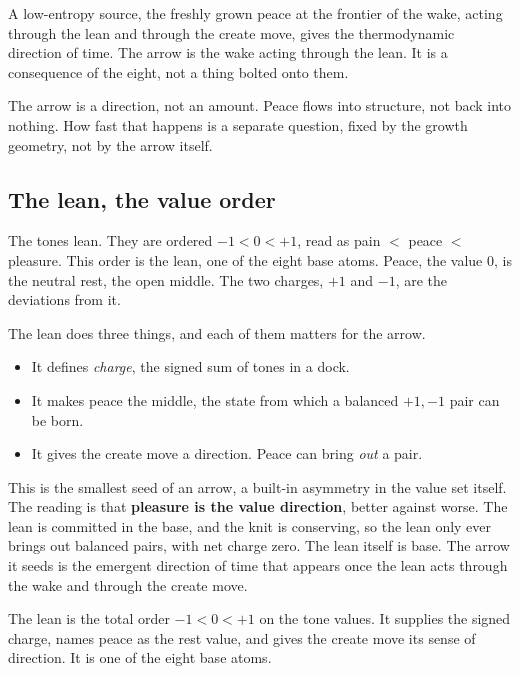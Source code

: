 A low-entropy source, the freshly grown peace at the frontier of the wake, acting through the lean and through the create move, gives the thermodynamic direction of time. The arrow is the wake acting through the lean. It is a consequence of the eight, not a thing bolted onto them.

\begin{result}
The arrow is a direction, not an amount. Peace flows into structure, not back into nothing. How fast that happens is a separate question, fixed by the growth geometry, not by the arrow itself.
\end{result}

\subsection{The lean, the value order}

The tones lean. They are ordered $-1 < 0 < +1$, read as pain $<$ peace $<$ pleasure. This order is the lean, one of the eight base atoms. Peace, the value $0$, is the neutral rest, the open middle. The two charges, $+1$ and $-1$, are the deviations from it.

The lean does three things, and each of them matters for the arrow.

\begin{itemize}
\item It defines \emph{charge}, the signed sum of tones in a dock.
\item It makes peace the middle, the state from which a balanced $+1, -1$ pair can be born.
\item It gives the create move a direction. Peace can bring \emph{out} a pair.
\end{itemize}

This is the smallest seed of an arrow, a built-in asymmetry in the value set itself. The reading is that \textbf{pleasure is the value direction}, better against worse. The lean is committed in the base, and the knit is conserving, so the lean only ever brings out balanced pairs, with net charge zero. The lean itself is base. The arrow it seeds is the emergent direction of time that appears once the lean acts through the wake and through the create move.

\begin{definition}
The lean is the total order $-1 < 0 < +1$ on the tone values. It supplies the signed charge, names peace as the rest value, and gives the create move its sense of direction. It is one of the eight base atoms.
\end{definition}

